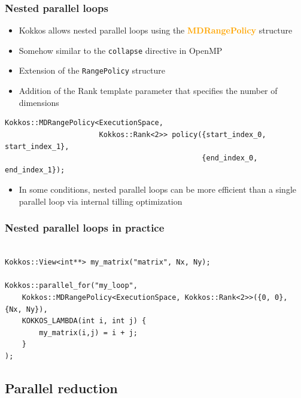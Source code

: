 \documentclass[aspectratio=169]{beamer}
\newcommand{\highlight}[1]{\textcolor{orange}{\textbf{#1}}}
\begin{document}
\begin{frame}[fragile]
    \frametitle{Nested parallel loops}

\begin{itemize}
    \item Kokkos allows nested parallel loops using the \highlight{MDRangePolicy} structure
    \item Somehow similar to the \texttt{collapse} directive in OpenMP
    \item Extension of the \texttt{RangePolicy} structure
    \item Addition of the Rank template parameter that specifies the number of dimensions
\end{itemize}

\footnotesize
\begin{verbatim}
Kokkos::MDRangePolicy<ExecutionSpace, 
                      Kokkos::Rank<2>> policy({start_index_0, start_index_1}, 
                                              {end_index_0, end_index_1});
\end{verbatim}

\normalsize
\begin{itemize}
    \item In some conditions, nested parallel loops can be more efficient than a single parallel loop via internal tilling optimization
\end{itemize}

\end{frame}


\begin{frame}[fragile]
    \frametitle{Nested parallel loops in practice}

\footnotesize
\begin{verbatim}

Kokkos::View<int**> my_matrix("matrix", Nx, Ny);

Kokkos::parallel_for("my_loop", 
    Kokkos::MDRangePolicy<ExecutionSpace, Kokkos::Rank<2>>({0, 0}, {Nx, Ny}),
    KOKKOS_LAMBDA(int i, int j) { 
        my_matrix(i,j) = i + j;
    }
);
\end{verbatim}
\end{frame}


\subsection[Parallel reduction]{Parallel reduction}
\end{document}
